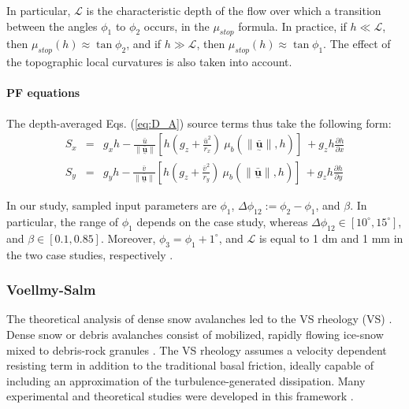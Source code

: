 \documentclass{article}
\begin{document}
In particular, $\mathcal{L}$ is the characteristic depth of the flow over which a transition between the angles $\phi_{1}$ to $\phi_{2}$ occurs, in the $\mu_{stop}$ formula. In practice, if $h\ll \mathcal L$, then $\mu_{stop}(h)\approx \tan\phi_{2}$, and if $h\gg \mathcal L$, then $\mu_{stop}(h)\approx\tan\phi_{1}$. The effect of the topographic local curvatures is also taken into account.

 \paragraph{PF equations} The depth-averaged Eqs. (\ref{eq:D_A}) source terms thus take the following form:
\begin{eqnarray}\label{eq:S_terms_PF}
S_{x} &=&  g_{x} h -  \frac{\bar{u}}{\| \underset{^\sim}{\bar{\textbf{u}}} \|}\left[h \left(g_z+\frac{\bar{u}^2}{r_x}\right) \ \mu_{b}(\|\underset{^\sim}{\bar{\textbf{u}}} \| , h)\right] \ + g_{z}h\frac{\partial h}{\partial x} \nonumber \\
S_{y} &=&  g_{y} h - \frac{\bar{v}}{\| \underset{^\sim}{\bar{\textbf{u}}} \|}\left[h \left(g_z +\frac{\bar{v}^2}{r_y}\right) \ \mu_{b}(\|\underset{^\sim}{\bar{\textbf{u}}} \| , h)\right] \ + g_{z}h\frac{\partial h}{\partial y}
\end{eqnarray}

In our study, sampled input parameters are $\phi_1$, $\Delta \phi_{12}:=\phi_2-\phi_1$, and $\beta$. In particular, the range of $\phi_1$ depends on the case study, whereas $\Delta \phi_{12} \in [10^{\mathrm{\circ}}, 15^{\mathrm{\circ}}]$, and $\beta \in [0.1, 0.85]$. Moreover, $\phi_3=\phi_1+1^\mathrm{\circ}$, and $\mathcal{L}$ is equal to 1 dm and 1 mm in the two case studies, respectively \citep{PouliquenForterre2002,ForterrePouliquen2003}.

\subsubsection{Voellmy-Salm}\label{VSM}
The theoretical analysis of dense snow avalanches led to the VS rheology (VS) \citep{Voellmy1955, Salm1990, Salm1993, Bartelt1999}. Dense snow or debris avalanches consist of mobilized, rapidly flowing ice-snow mixed to debris-rock granules \citep{BarteltMcArdell2009}. The VS rheology assumes a velocity dependent resisting term in addition to the traditional basal friction, ideally capable of including an approximation of the turbulence-generated dissipation. Many experimental and theoretical studies were developed in this framework \citep{Gruber2007, Kern2009, Christen2010, Fischer2012}.
\end{document}
